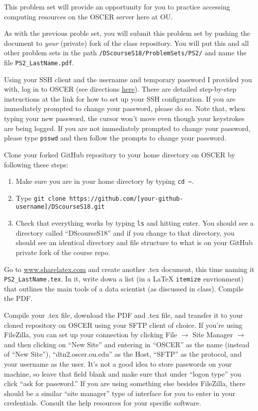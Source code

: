 \documentclass[12pt,english]{exam}
\begin{document}
This problem set will provide an opportunity for you to practice accessing computing resources on the OSCER server here at OU.

As with the previous proble set, you will submit this problem set by pushing the document to \emph{your} (private) fork of the class repository. You will put this and all other problem sets in the path \texttt{/DScourseS18/ProblemSets/PS2/} and name the file \texttt{PS2\_LastName.pdf}.
\begin{questions}
\question Using your SSH client and the username and temporary password I provided you with, log in to OSCER (see directions \href{www.ou.edu/content/oscer/getting_started_using_oscer.html}{here}). There are detailed step-by-step instructions at the link for how to set up your SSH configuration. If you are immediately prompted to change your password, please do so. Note that, when typing your new password, the cursor won't move even though your keystrokes are being logged. If you are not immediately prompted to change your password, please type \texttt{psswd} and then follow the prompts to change your password.

\question Clone your forked GitHub repository to your home directory on OSCER by following these steps:
\begin{enumerate}
	\item Make sure you are in your home directory by typing \texttt{cd \~}.
	\item Type \texttt{git clone https://github.com/[your-github-username]/DScourseS18.git}
	\item Check that everything works by typing \texttt{ls} and hitting enter. You should see a directory called ``DScourseS18'' and if you change to that directory, you should see an identical directory and file structure to what is on your GitHub private fork of the course repo.
\end{enumerate}

\question Go to \url{www.sharelatex.com} and create another .tex document, this time naming it \texttt{PS2\_LastName.tex}. In it, write down a list (in a LaTeX \texttt{itemize} envrionment) that outlines the main tools of a data scientist (as discussed in class). Compile the PDF.

\question Compile your .tex file, download the PDF and .tex file, and transfer it to your cloned repository on OSCER using your SFTP client of choice. If you're using FileZilla, you can set up your connection by clicking File $\rightarrow$ Site Manager $\rightarrow$ and then clicking on ``New Site'' and entering in ``OSCER'' as the name (instead of ``New Site''), ``dtn2.oscer.ou.edu'' as the Host, ``SFTP'' as the protocol, and your username as the user. It's not a good idea to store passwords on your machine, so leave that field blank and make sure that under ``logon type'' you click ``ask for password.'' If you are using something else besides FileZilla, there should be a similar ``site manager'' type of interface for you to enter in your credentials. Consult the help resources for your specific software.


\end{questions}
\end{document}
